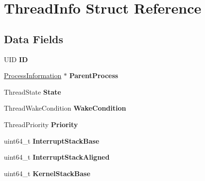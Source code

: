 \hypertarget{structThreadInfo}{}\section{Thread\+Info Struct Reference}
\label{structThreadInfo}
\subsection*{Data Fields}
\begin{DoxyCompactItemize}
\item 
U\+ID {\bfseries ID}\hypertarget{structThreadInfo_ada37af8c41d0e02825eb6ba18a23acc3}{}\label{structThreadInfo_ada37af8c41d0e02825eb6ba18a23acc3}

\item 
\hyperlink{structProcessInformation}{Process\+Information} $\ast$ {\bfseries Parent\+Process}\hypertarget{structThreadInfo_a0bae5bd086d4146ba9ddf6bce2fee1ec}{}\label{structThreadInfo_a0bae5bd086d4146ba9ddf6bce2fee1ec}

\item 
Thread\+State {\bfseries State}\hypertarget{structThreadInfo_a5c1540a3e237727554b9064b809ab82c}{}\label{structThreadInfo_a5c1540a3e237727554b9064b809ab82c}

\item 
Thread\+Wake\+Condition {\bfseries Wake\+Condition}\hypertarget{structThreadInfo_ab791c21f54e7b7371fef46fd5a3a2361}{}\label{structThreadInfo_ab791c21f54e7b7371fef46fd5a3a2361}

\item 
Thread\+Priority {\bfseries Priority}\hypertarget{structThreadInfo_a7aadd81b1420e832b7c6378653abea84}{}\label{structThreadInfo_a7aadd81b1420e832b7c6378653abea84}

\item 
uint64\+\_\+t {\bfseries Interrupt\+Stack\+Base}\hypertarget{structThreadInfo_a02097606bfbca391f4da58bd51654589}{}\label{structThreadInfo_a02097606bfbca391f4da58bd51654589}

\item 
uint64\+\_\+t {\bfseries Interrupt\+Stack\+Aligned}\hypertarget{structThreadInfo_af89c53ff2902c3357160097e463f7db1}{}\label{structThreadInfo_af89c53ff2902c3357160097e463f7db1}

\item 
uint64\+\_\+t {\bfseries Kernel\+Stack\+Base}\hypertarget{structThreadInfo_abbcefad3be5df939889035f2d0feeb3b}{}\label{structThreadInfo_abbcefad3be5df939889035f2d0feeb3b}


\end{DoxyCompactItemize}

